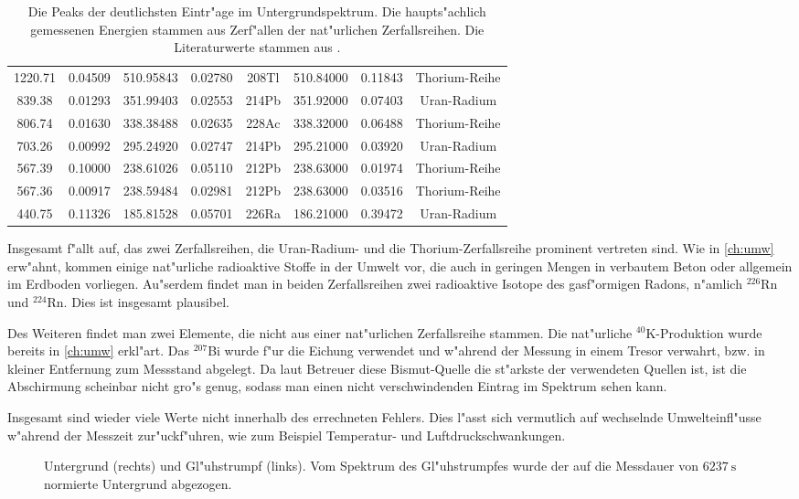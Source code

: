 \documentclass[12pt]{article}
\begin{document}
\begin{table}[h!]
{\begin{tabular}{cccccccc}
			1220.71 & 0.04509 & 510.95843 & 0.02780 & 208Tl & 510.84000 & 0.11843 & Thorium-Reihe \\
			\rowcolor[rgb]{ .949,  .949,  .949} 839.38 & 0.01293 & 351.99403 & 0.02553 & 214Pb & 351.92000 & 0.07403 & Uran-Radium \\
			806.74 & 0.01630 & 338.38488 & 0.02635 & 228Ac & 338.32000 & 0.06488 & Thorium-Reihe \\
			\rowcolor[rgb]{ .949,  .949,  .949} 703.26 & 0.00992 & 295.24920 & 0.02747 & 214Pb & 295.21000 & 0.03920 & Uran-Radium \\
			567.39 & 0.10000 & 238.61026 & 0.05110 & 212Pb & 238.63000 & 0.01974 & Thorium-Reihe \\
			\rowcolor[rgb]{ .949,  .949,  .949} 567.36 & 0.00917 & 238.59484 & 0.02981 & 212Pb & 238.63000 & 0.03516 & Thorium-Reihe \\
			440.75 & 0.11326 & 185.81528 & 0.05701 & 226Ra & 186.21000 & 0.39472 & Uran-Radium \\
		\end{tabular}%
	}
	\caption{Die Peaks der deutlichsten Eintr"age im Untergrundspektrum. Die haupts"achlich gemessenen Energien stammen aus Zerf"allen der nat"urlichen Zerfallsreihen. Die Literaturwerte stammen aus \cite{cite1}.}
	\label{tab:untergrund}
\end{table}%
\noindent
Insgesamt f"allt auf, das zwei Zerfallsreihen, die Uran-Radium- und die Thorium-Zerfallsreihe prominent vertreten sind. Wie in \ref{ch:umw} erw"ahnt, kommen einige nat"urliche radioaktive Stoffe in der Umwelt vor, die auch in geringen Mengen in verbautem Beton oder allgemein im Erdboden vorliegen. Au"serdem findet man in beiden Zerfallsreihen zwei radioaktive Isotope des gasf"ormigen Radons, n"amlich $^{226}$Rn und $^{224}$Rn. Dies ist insgesamt plausibel.\par 
Des Weiteren findet man zwei Elemente, die nicht aus einer nat"urlichen Zerfallsreihe stammen. Die nat"urliche $^{40}$K-Produktion wurde bereits in \ref{ch:umw} erkl"art. Das $^{207}$Bi wurde f"ur die Eichung verwendet und w"ahrend der Messung in einem Tresor verwahrt, bzw. in kleiner Entfernung zum Messstand abgelegt. Da laut Betreuer diese Bismut-Quelle die st"arkste der verwendeten Quellen ist, ist die Abschirmung scheinbar nicht gro"s genug, sodass man einen nicht verschwindenden Eintrag im Spektrum sehen kann.  \par 
Insgesamt sind wieder viele Werte nicht innerhalb des errechneten Fehlers. Dies l"asst sich vermutlich auf wechselnde Umwelteinfl"usse w"ahrend der Messzeit zur"uck\-f"uhren, wie zum Beispiel Temperatur- und Luftdruckschwankungen.  
\begin{figure}[h!]
	\centering
	\caption[Untergrund und Gl"uhstumpf]{Untergrund (rechts) und Gl"uhstrumpf (links). Vom Spektrum des Gl"uhstrumpfes wurde der auf die Messdauer von $\SI{6237}{\second}$ normierte Untergrund abgezogen.}
	\label{fig:untergrund}
\end{figure}
\clearpage
\end{document}
